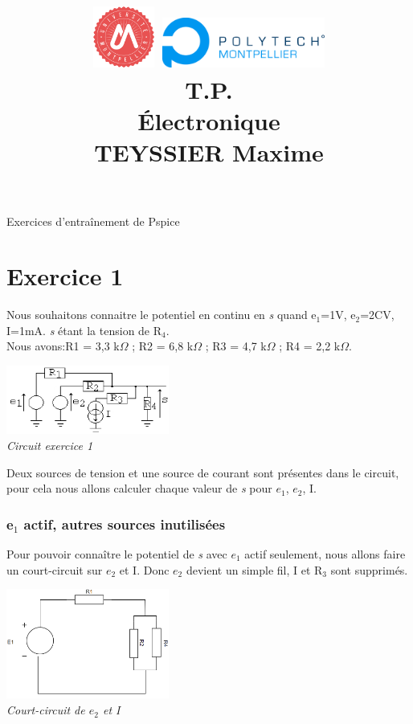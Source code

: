 \documentclass[a4paper,12pt,titlepage]{article}
\title{
    \includegraphics[width=0.15\textwidth]{UM.png}
    \hspace{1cm}    
    \includegraphics[width=0.4\textwidth]{Polytech.png}\\
    \vspace{5cm}
    \textbf{T.P.\\Électronique}\\ TEYSSIER Maxime\\
    \vfill
}
\begin{document}
\maketitle
\newpage

\begin{center}
    \Large{Exercices d'entraînement de Pspice}
\end{center}
\section{Exercice 1}

Nous souhaitons connaitre le potentiel en continu en \textit{s} quand e$_1$=1V, e$_2$=2CV, I=1mA.
\textit{s} étant la tension de R$_4$.\\
Nous avons:R1 = 3,3 k$\Omega$ ; R2 = 6,8 k$\Omega$ ; R3 = 4,7 k$\Omega$ ; R4 = 2,2 k$\Omega$.\\

\begin{center}
    \includegraphics[width=0.4\textwidth]{Exo1/Exo1.PNG}\\
    \textit{Circuit exercice 1}\\
\end{center}

Deux sources de tension et une source de courant sont présentes dans le circuit, pour cela nous allons calculer chaque valeur de \textit{s} pour $e_1$, $e_2$, I.

\subsubsection{e$_1$ actif, autres sources inutilisées}

Pour pouvoir connaître le potentiel de \textit{s} avec $e_1$ actif seulement, nous allons faire un court-circuit sur $e_2$ et I.
Donc $e_2$ devient un simple fil, I et R$_3$ sont supprimés. 

\begin{center}
    \includegraphics[width=0.4\textwidth]{Exo1/Exo1-1.PNG}\\
    \textit{Court-circuit de $e_2$ et I}\\
\end{center}
\end{document}
